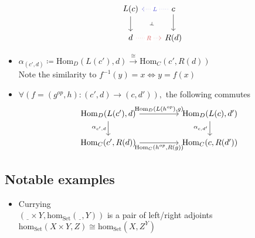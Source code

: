 \[\begin{tikzcd}
	{L(c)} & c \\
	d & {R(d)}
	\arrow[from=1-2, to=2-2]
	\arrow[from=1-1, to=2-1]
	\arrow[""{name=0, anchor=center, inner sep=0}, "L"{description}, color={rgb,255:red,92;green,92;blue,214}, dotted, from=1-2, to=1-1]
	\arrow[""{name=1, anchor=center, inner sep=0}, "R"{description}, color={rgb,255:red,214;green,92;blue,92}, dotted, from=2-1, to=2-2]
	\arrow["\dashv"{anchor=center, rotate=-93}, draw=none, from=0, to=1]
\end{tikzcd}\]

\begin{itemize}
  \item $\alpha_{(c', d)} \coloneqq \mathrm{Hom}_D(L(c'), d)
    \overset{\cong}{\to} \mathrm{Hom}_C(c', R(d))$\\
    Note the similarity to $f^{-1}(y)=x \iff y=f(x)$
  \item $\forall (f = (g^{op}, h): (c', d) \to (c, d')),$
    the following commutes
    \[\begin{tikzcd}
      {\mathrm{Hom}_D(L(c'), d)} && {\mathrm{Hom}_D(L(c),d')} \\
      {\mathrm{Hom}_C(c', R(d))} && {\mathrm{Hom}_C(c,R(d'))}
      \arrow["{\alpha_{c',d}}"', from=1-1, to=2-1]
      \arrow["{\alpha_{c,d'}}"', from=1-3, to=2-3]
      \arrow["{\mathrm{Hom}_D(L(h^{op}), g)}", from=1-1, to=1-3]
      \arrow["{\mathrm{Hom}_C(h^{op}, R(g))}"', from=2-1, to=2-3]
    \end{tikzcd}\]
\end{itemize}

\subsection{Notable examples}
\begin{itemize}
  \item Currying \parencite{fong:7sketches}\\
    $(\underline{\ \ } \times Y, \mathrm{hom}_{\mathrm{Set}}(\underline{\ \ }, Y))$
    is a pair of left/right adjoints\\
    $\mathrm{hom}_{\mathrm{Set}}(X\times Y, Z) \cong \mathrm{hom}_{\mathrm{Set}}
      (X, Z^Y)$
\end{itemize}